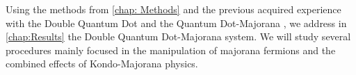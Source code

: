 Using the methods from \ref{chap: Methods} and the previous acquired experience with the Double Quantum Dot and the Quantum Dot-Majorana , we address in \ref{chap:Results} the  Double Quantum Dot-Majorana system. We will study several procedures  mainly focused in the manipulation of majorana fermions and the combined effects of Kondo-Majorana physics. 







